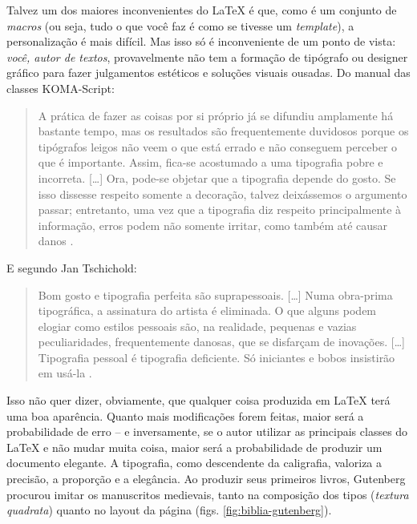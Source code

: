 \documentclass[a4paper,nols,bidi,nohyper,nobib]{tufte-book}
\begin{document}
Talvez um dos maiores inconvenientes do \LaTeX{} é que, como é um conjunto de \textit{macros} (ou seja, tudo o que você faz é como se tivesse um \textit{template}), a personalização é mais difícil. Mas isso só é inconveniente de um ponto de vista: \textit{você, autor de textos}, provavelmente não tem a formação de tipógrafo ou designer gráfico para fazer julgamentos estéticos e soluções visuais ousadas. Do manual das classes KOMA-Script{}:

\begin{quote}
A prática de fazer as coisas por si próprio já se difundiu amplamente há bastante tempo, mas os resultados são frequentemente duvidosos porque os tipógrafos leigos não veem o que está errado e não conseguem perceber o que é importante. Assim, fica-se acostumado a uma tipografia pobre e incorreta. [\ldots ] Ora, pode-se objetar que a tipografia depende do gosto. Se isso dissesse respeito somente a decoração, talvez deixássemos o argumento passar; entretanto, uma vez que a tipografia diz respeito principalmente à informação, erros podem não somente irritar, como também até causar danos \parencite{willberg2000}.
\end{quote}

E segundo Jan Tschichold:


\begin{quote}
Bom gosto e tipografia perfeita são suprapessoais. [\ldots] 
Numa obra-prima tipográfica, a assinatura do artista é eliminada. O que alguns podem elogiar como estilos pessoais são, na realidade, pequenas e vazias peculiaridades, frequentemente danosas, que se disfarçam de inovações. [\ldots] Tipografia pessoal é tipografia deficiente. Só iniciantes e bobos insistirão em usá-la \parencite[p. 25--26]{tschichold2007forma}.
\end{quote}

Isso não quer dizer, obviamente, que qualquer coisa produzida em \LaTeX{} terá uma boa aparência. Quanto mais modificações forem feitas, maior será a probabilidade de erro -- e inversamente, se o autor utilizar as principais classes do \LaTeX{} e não mudar muita coisa, maior será a probabilidade de produzir um documento elegante. A tipografia, como descendente da caligrafia, valoriza a precisão, a proporção e a elegância. Ao produzir seus primeiros livros, Gutenberg procurou imitar os manuscritos medievais, tanto na composição dos tipos (\textit{textura quadrata}) quanto no layout da página (figs. \ref{fig:biblia-gutenberg}). 
\end{document}
